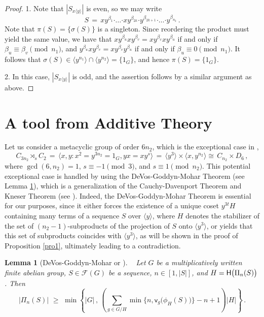 \documentclass[leqno,a4paper]{amsart}
\def\HH{{\sf H}}
\def\bd{{\boldsymbol{\cdot}}}
\theoremstyle{plain}
\newtheorem{lemma}[theorem]{Lemma}
\theoremstyle{definition}
\numberwithin{equation}{section}
\begin{document}
	\begin{proof}
		1. Note that $|S_{x\langle y \rangle}|$ is even, so we may write
		    \[
		      S \, = \, xy^{\beta_1} \bd \ldots \bd xy^{\beta_{2k}} \bd y^{\beta_{2k+1}} \bd \ldots \bd y^{\beta_{n_2}} \,.
		    \]
		    Note that $\pi(S)=\{\sigma(S)\}$ is a singleton.
		    Since reordering the product must yield the same value, we have that $xy^{\beta_u}  xy^{\beta_v} = xy^{\beta_v}  xy^{\beta_u}$ if and only if $\beta_u \equiv \beta_v \pmod {n_1}$, and $y^{\beta_u}  xy^{\beta_v} = xy^{\beta_v}  y^{\beta_u}$ if and only if $\beta_u \equiv 0 \pmod {n_1}$. It follows that $\sigma(S) \in \langle y^{n_1} \rangle \cap \langle y^{n_2} \rangle = \{1_G \}$, and hence $\pi(S) = \{1_G \}$.
		
		
		2. In this case, $|S_{x\langle y \rangle}|$ is odd, and the assertion follows by a similar argument as above.
	\end{proof}

	
	
	
	
	
	\bigskip
	\section{A tool from Additive Theory} \label{sec:additive}

	
	
	Let us consider a metacyclic group of order $6n_2$, which is the exceptional case in \cite{AMR},
	\[
	  C_{3n_2} \rtimes_s C_2 \, = \, \langle x,y \colon x^2 = y^{3n_2} = 1_G, yx = xy^s \rangle  \, = \, \langle y^3 \rangle \times \langle x,y^{n_2} \rangle \cong \, C_{n_2} \times D_6 \,,
	\]
	where $\gcd(6,n_2) = 1$,  $s\equiv -1\pmod 3$, and $s\equiv 1 \pmod {n_2}$.
	This potential exceptional case is handled by using the DeVos-Goddyn-Mohar Theorem (see Lemma \ref{le1}), which is a generalization of the Cauchy-Davenport Theorem and Kneser Theorem (see \cite[Theorem 6.1 and Theorem 6.2]{Gry}).
	Indeed, the DeVos-Goddyn-Mohar Theorem is essential for our purposes, since it either forces the existence of a unique coset $y^{3t}H$ containing many terms of a sequence $S$ over $\langle y \rangle$, where $H$ denotes the stabilizer of the set of $(n_2-1)$-subproducts of the projection of $S$ onto $\langle y^3 \rangle$, or yields that this set of subproducts coincides with $\langle y^3 \rangle$, as will be shown in the proof of Proposition \ref{pro1}, ultimately leading to a contradiction.
	
	
	\smallskip
	\begin{lemma}[DeVos-Goddyn-Mohar {\cite[Corollary 1.5]{DGM} or \cite[Theorem 13.1]{Gry}}] \label{le1}~
		Let $G$ be a multiplicatively written finite abelian group, $S\in \mathcal F(G)$ be a sequence, $n \in [1,|S|]$, and $H = \HH \big( \Pi_n (S) \big)$. Then
		\[
		|\Pi_n (S)| \,\, \ge \,\, \min\left\{ |G| \, , \, \left( \sum_{g \in G/H} \min \{n, \mathsf v_g \big( \phi_H (S) \big) \} - n + 1 \right)|H| \right\} \,.
		\]
	\end{lemma}
	
\end{document}
